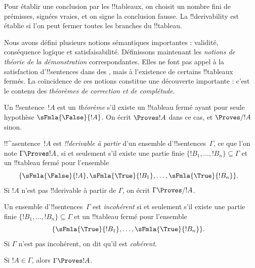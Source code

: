 \documentclass[../../../include/open-logic-section]{subfiles}
\begin{document}
      {}
      {}
      

Pour établir une conclusion par les !!{tableau}x, on choisit
un nombre fini de prémisses, signées vraies, et on signe
la conclusion fausse. La !!{derivability} est établie
si l'on peut fermer toutes les branches du !!{tableau}.

\begin{explain}
Nous avons défini plusieurs notions sémantiques importantes : validité,
conséquence logique et satisfaisabilité. Définissons maintenant les
\emph{notions de théorie de la démonstration} correspondantes. Elles ne
font pas appel à la satisfaction d'!!{sentence}s dans des
, mais à l'existence de
certains !!{tableau}x fermés. La coïncidence de ces
notions constitue une découverte importante : c'est le contenu des
\emph{théorèmes de correction et de complétude}.
\end{explain}


\begin{defn}[Théorèmes]
Un !!{sentence}~$!A$ est un \emph{théorème} s'il existe un
!!{tableau} fermé ayant pour seule hypothèse $\sFmla{\False}{!A}$.
On écrit $\Proves !A$ dans ce cas, et $\Proves/ !A$ sinon.
\end{defn}

\begin{defn}[!!^{derivability}]
!!^a{sentence}~$!A$ est \emph{!!{derivable} à partir} d'un ensemble
d'!!{sentence}s~$\Gamma$, ce que l'on note $\Gamma \Proves !A$,
si et seulement s'il existe une partie finie
$\{!B_1, \dots, !B_n\} \subseteq \Gamma$ et un !!{tableau} fermé
pour l'ensemble
\[
\{
  \sFmla{\False}{!A},
  \sFmla{\True}{!B_1}, \dots,
  \sFmla{\True}{!B_n}
\}.
\]
Si $!A$ n'est pas !!{derivable} à partir de $\Gamma$, on écrit
$\Gamma \Proves/ !A$.
\end{defn}

\begin{defn}[Cohérence]
Un ensemble d'!!{sentence}s~$\Gamma$ est \emph{incohérent} si et
seulement s'il existe une partie finie
$\{!B_1, \dots, !B_n\} \subseteq \Gamma$ et un !!{tableau} fermé
pour l'ensemble
\[
\{
  \sFmla{\True}{!B_1}, \dots,
  \sFmla{\True}{!B_n}  
\}.
\]
Si $\Gamma$ n'est pas incohérent, on dit qu'il est \emph{cohérent}.
\end{defn}

\begin{prop}[Réflexivité]
Si $!A \in \Gamma$, alors $\Gamma \Proves !A$.
\end{prop}
\end{document}
